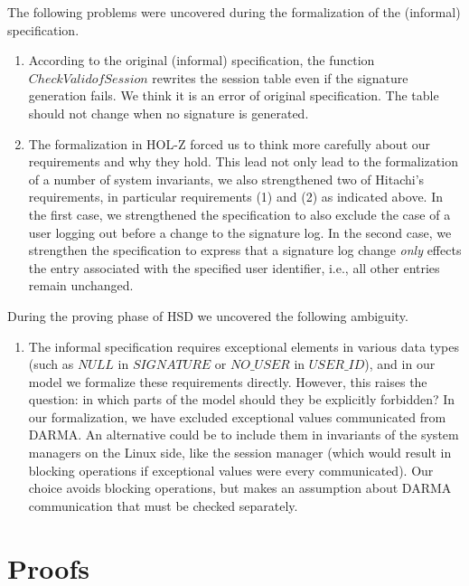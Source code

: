 \documentclass[a4paper,pdftex]{article}
\begin{document}
The following problems were uncovered during the formalization
of the (informal) specification.
\begin{enumerate} 
\item According to the original (informal)
specification, the function $CheckValidofSession$ rewrites the session
table even if the signature generation fails. We think it is an error
of original specification. The table should not 
change when no signature is generated. 
\item The formalization in HOL-Z forced us to think more carefully
about our requirements and why they hold.  This lead not only lead to
the formalization of a number of system invariants, we also strengthened
two of Hitachi's requirements, in particular requirements (1) and (2) as
indicated above.  In the first case, we strengthened the specification
to also exclude the case of a user logging out before a change to the
signature log.  In the second case, we strengthen the specification
to express that a signature log change \emph{only} effects the entry
associated with the specified user identifier, i.e., all other entries
remain unchanged.
\end{enumerate}

During the proving phase of HSD we uncovered the following ambiguity.
\begin{enumerate} 
\item The informal
specification requires exceptional elements in various data types (such
as $NULL$ in $SIGNATURE$ or $NO\_USER$ in $USER\_ID$), and in our model
we formalize these requirements directly. However, this raises the
question: in which parts of the model should they be explicitly
forbidden?  In our formalization, we have excluded exceptional values
communicated from DARMA. An alternative could be to include them in
invariants of the system managers on the Linux side, like the session
manager (which would result in blocking operations if exceptional values
were every communicated). Our choice avoids blocking operations, but
makes an assumption about DARMA communication that must be checked
separately.
\end{enumerate}



\section{Proofs}\label{sec:proof}

%
%
%
%
%
%

\clearpage{}


\clearpage{}
\printindex
\end{document}
